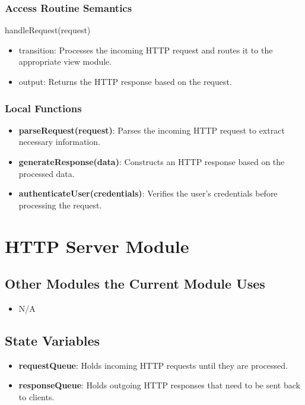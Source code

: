 \documentclass[12pt, titlepage]{article}
\begin{document}
\subsubsection{Access Routine Semantics}

handleRequest(request)
\begin{itemize}
\item transition:  Processes the incoming HTTP request and routes it to the appropriate view module.
\item output: Returns the HTTP response based on the request.
\end{itemize}
\subsubsection{Local Functions}
\begin{itemize}
  \item \textbf{parseRequest(request)}: Parses the incoming HTTP request to extract necessary information.
  \item \textbf{generateResponse(data)}: Constructs an HTTP response based on the processed data.
  \item \textbf{authenticateUser(credentials)}: Verifies the user's credentials before processing the request.
\end{itemize}
\newpage

\newpage
\section{HTTP Server Module}

\subsection{Other Modules the Current Module Uses}
\begin{itemize}
\item N/A
\end{itemize}

\subsection{State Variables}
\begin{itemize}
    \item \textbf{requestQueue}: Holds incoming HTTP requests until they are processed.
    \item \textbf{responseQueue}: Holds outgoing HTTP responses that need to be sent back to clients.
\end{itemize}
\end{document}
